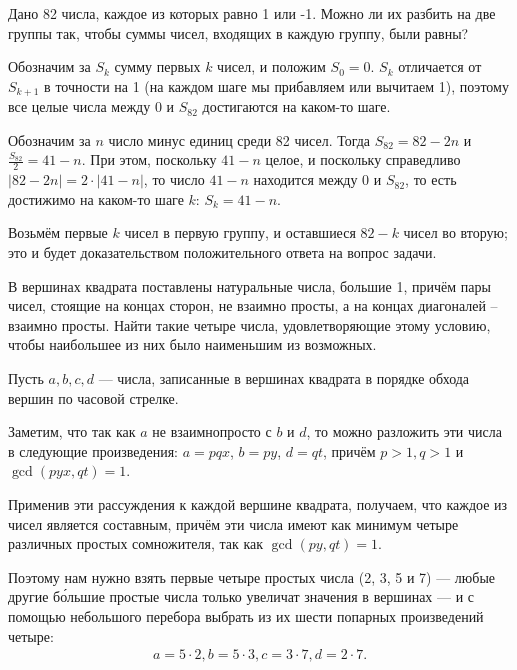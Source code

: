 

\begin{itemize}
\itA Дано 82 числа, каждое из которых равно 1 или -1. Можно ли их разбить на две группы так, 
чтобы суммы чисел, входящих в каждую группу, были равны?

\itr Обозначим за $S_k$ сумму первых $k$ чисел, и положим $S_0 = 0$. 
$S_k$ отличается от $S_{k+1}$ в точности на 1 (на каждом шаге мы прибавляем или 
вычитаем 1), поэтому все целые числа между $0$ и $S_{82}$ достигаются на каком-то шаге.

Обозначим за $n$ число минус единиц среди 82 чисел. Тогда $S_{82} = 82-2n$
и $\frac{S_{82}}{2} = 41-n$. При этом, поскольку $41-n$ целое, и поскольку справедливо 
$|82-2n|=2\cdot|41-n|$, то число $41-n$ находится между 0 и $S_{82}$, то есть 
достижимо на каком-то шаге $k$: $S_k = 41-n$.

Возьмём первые $k$ чисел в первую группу, и оставшиеся $82-k$ чисел во вторую; это и будет
доказательством положительного ответа на вопрос задачи.
\end{itemize}


\begin{itemize}
\itC В вершинах квадрата поставлены натуральные числа, большие 1, причём пары чисел, стоящие на концах сторон, не взаимно просты, а на концах диагоналей – взаимно просты. Найти такие четыре числа, удовлетворяющие этому условию,
чтобы наибольшее из них было наименьшим из возможных.

\itr 
Пусть $a,b,c,d$ --- числа, записанные в вершинах квадрата в порядке обхода вершин по часовой стрелке. 

Заметим, что так как $a$ не взаимнопросто с $b$ и $d$, то можно разложить эти числа в следующие произведения:
$a = pqx$, $b = py$, $d = qt$, причём $p>1, q>1$ и $\gcd(pyx,qt)=1$. 

Применив эти рассуждения к каждой вершине квадрата, получаем, что каждое из чисел является
составным, причём эти числа имеют как минимум четыре различных простых сомножителя, 
так как $\gcd(py,qt)=1$. 

Поэтому нам нужно взять первые четыре простых числа (2, 3, 5 и 7) --- любые другие б\'ольшие простые числа
только увеличат значения в вершинах --- и с помощью небольшого перебора
выбрать из их шести попарных произведений четыре:
$$
\begin{array}{l}
a=5 \cdot 2,
b=5 \cdot 3,
c=3 \cdot 7,
d=2 \cdot 7.
\end{array}
$$
\end{itemize}

